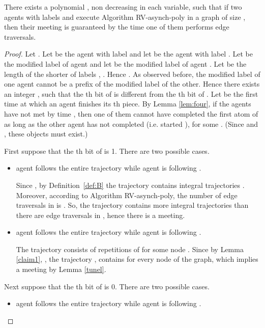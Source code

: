 \documentclass [11pt] {article}
\begin{document}
\begin{theorem}\label{main}
There exists a polynomial , non decreasing in each variable, such that
if two agents with labels  and  execute Algorithm RV-asynch-poly in a graph of size , then their meeting is guaranteed by the time one of them performs  edge traversals. 
\end{theorem}

\begin{proof}
Let . Let  be the agent with label  and let  be the agent with label .
Let  be the modified label of agent  and let  be the modified label of agent . Let  be the length of the shorter of labels ,  .
Hence .
As observed before, the modified label of one agent cannot be a prefix of the modified label of the other. Hence there exists an integer {}, such that 
the th bit of  is different from the th bit of .
{Let  be the first time at which an agent finishes its th piece.
By Lemma \ref{lem:four},  if the agents have not met by time ,} then one of them cannot have completed the first atom of   as long as the other agent has not completed  {(i.e. started )}, {for some . (Since  and , these objects must exist.)}


First suppose that the th bit of  is 1. There are two possible cases.

\begin{itemize}
\item agent  follows the entire trajectory  while agent  is following . 


Since , by Definition~\ref{def:B} the trajectory  contains  
integral trajectories . Moreover, according to Algorithm RV-asynch-poly, the number of {edge traversals} in  is . So, the trajectory  contains more integral trajectories  than there are {edge traversals} in , hence there is a meeting.

\item agent  follows the entire trajectory  while agent  is following  . 

The trajectory  consists of repetitions of  for some node . 
Since by Lemma \ref{claim1}, , the trajectory , contains  for every node  of the graph, which implies a meeting by Lemma \ref{tunel}.
\end{itemize}

Next suppose that the th bit of  is 0. There are two possible cases.

\begin{itemize}

\item agent  follows the entire trajectory  while agent  is following . 


\end{itemize}
\end{proof}
\end{document}
